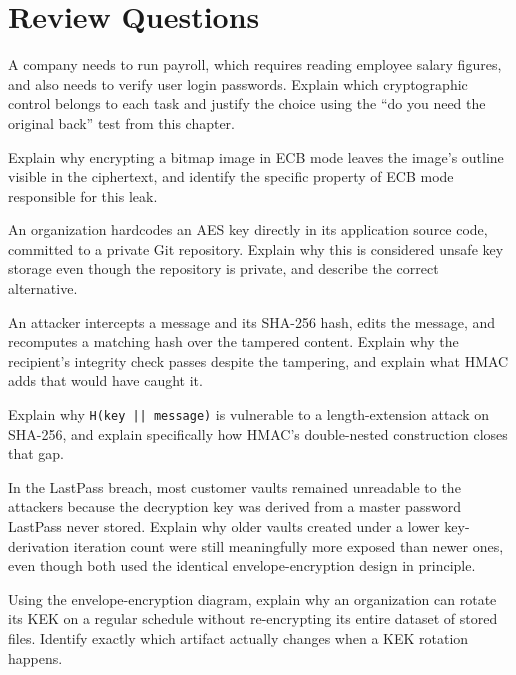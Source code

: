 \section*{Review Questions}
\begin{reviewquestions}
\item A company needs to run payroll, which requires reading employee salary figures, and also
needs to verify user login passwords. Explain which cryptographic control belongs to each task and
justify the choice using the ``do you need the original back'' test from this chapter.
\item Explain why encrypting a bitmap image in ECB mode leaves the image's outline visible in the
ciphertext, and identify the specific property of ECB mode responsible for this leak.
\item An organization hardcodes an AES key directly in its application source code, committed to a
private Git repository. Explain why this is considered unsafe key storage even though the
repository is private, and describe the correct alternative.
\item An attacker intercepts a message and its SHA-256 hash, edits the message, and recomputes a
matching hash over the tampered content. Explain why the recipient's integrity check passes despite
the tampering, and explain what HMAC adds that would have caught it.
\item Explain why \texttt{H(key || message)} is vulnerable to a length-extension attack on
SHA-256, and explain specifically how HMAC's double-nested construction closes that gap.
\item In the LastPass breach, most customer vaults remained unreadable to the attackers because
the decryption key was derived from a master password LastPass never stored. Explain why older
vaults created under a lower key-derivation iteration count were still meaningfully more exposed
than newer ones, even though both used the identical envelope-encryption design in principle.
\item Using the envelope-encryption diagram, explain why an organization can rotate its KEK on a
regular schedule without re-encrypting its entire dataset of stored files. Identify exactly
which artifact actually changes when a KEK rotation happens.
\end{reviewquestions}

